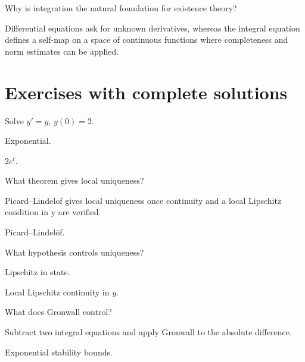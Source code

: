 \begin{problem}\label{prob:ii19-problem-12}
Why is integration the natural foundation for existence theory?
\end{problem}
\begin{solution}
Differential equations ask for unknown derivatives, whereas the integral equation defines a self-map on a space of continuous functions where completeness and norm estimates can be applied.
\end{solution}

\section{Exercises with complete solutions}

\begin{exercise}\label{exr:ii19-01}
Solve $y'=y$, $y(0)=2$.
\end{exercise}
\begin{hint}
Exponential.
\end{hint}
\begin{solution}
$2e^t$.
\end{solution}

\begin{exercise}\label{exr:ii19-02}
What theorem gives local uniqueness?
\end{exercise}
\begin{hint}
Picard--Lindelof gives local uniqueness once continuity and a local Lipschitz condition in y are verified.
\end{hint}
\begin{solution}
Picard--Lindelöf.
\end{solution}

\begin{exercise}\label{exr:ii19-03}
What hypothesis controls uniqueness?
\end{exercise}
\begin{hint}
Lipschitz in state.
\end{hint}
\begin{solution}
Local Lipschitz continuity in $y$.
\end{solution}

\begin{exercise}\label{exr:ii19-04}
What does Gronwall control?
\end{exercise}
\begin{hint}
Subtract two integral equations and apply Gronwall to the absolute difference.
\end{hint}
\begin{solution}
Exponential stability bounds.
\end{solution}

